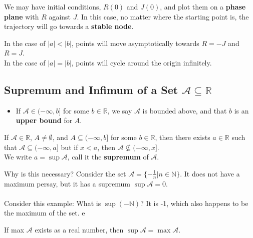 \documentclass[12pt]{article}
\begin{document}
We may have initial conditions, $R(0)$ and $J(0)$, and plot them on a \textbf{phase plane} with $R$ against $J$. In this case, no matter where the starting point is, the trajectory will go towards a \textbf{stable node}.
\begin{figure}[h!]
\centering
{}
\end{figure}

In the case of $|a| < |b|$, points will move asymptotically towards $R = -J$ and $R = J$. \\
In the case of $|a| = |b|$, points will cycle around the origin infinitely.
\newpage

\subsection{Supremum and Infimum of a Set $\mathcal{A} \subseteq \mathbb{R}$}
\begin{itemize}
\item If $\mathcal{A} \in (-\infty, b]$ for some $b \in \mathbb{R}$, we say $\mathcal{A}$ is bounded above, and that $b$ is an \textbf{upper bound} for $A$. 
\end{itemize}

\begin{theorem}
If $\mathcal{A} \in \mathbb{R}$, $A \neq \emptyset$, and $A \subseteq (-\infty, b]$ for some $b \in \mathbb{R}$, then there exists $a \in \mathbb{R}$ such that $\mathcal{A} \subseteq (-\infty, a ]$ but if $x < a$, then $\mathcal{A} \not \subseteq (-\infty, x]$. \\
We write $a = \sup{\mathcal{A}}$, call it the \textbf{supremum} of $\mathcal{A}$.
\end{theorem}

Why is this necessary? Consider the set $\mathcal{A} = \{-\frac{1}{n} | n \in \mathbb{N} \}$. It does not have a maximum persay, but it has a supremum $\sup{\mathcal{A}} = 0$. \\ \\
Consider this example: What is $\sup{(-\mathbb{N})}$? It is -1, which also happens to be the maximum of the set.
e
\begin{theorem}
If max $\mathcal{A}$ exists as a real number, then $\sup{\mathcal{A}} = \max{\mathcal{A}}$.
\end{theorem}
\end{document}
